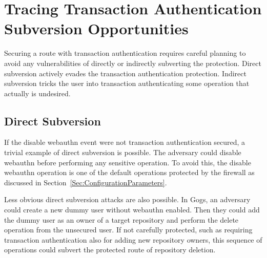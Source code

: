 


\section{Tracing Transaction Authentication \newline Subversion Opportunities}


Securing a route with transaction authentication requires careful planning to avoid any vulnerabilities of directly or indirectly subverting the protection. Direct subversion actively evades the transaction authentication protection. Indirect subversion tricks the user into transaction authenticating some operation that actually is undesired.

\subsection{Direct Subversion}
If the disable webauthn event were not transaction authentication secured, a trivial example of direct subversion is possible. The adversary could disable webauthn before performing any sensitive operation. To avoid this, the disable webauthn operation is one of the default operations protected by the firewall as discussed in Section~\ref{Sec:ConfigurationParameters}.


Less obvious direct subversion attacks are also possible. In Gogs, an adversary could create a new dummy user without webauthn enabled. Then they could add the dummy user as an owner of a target repository and perform the delete operation from the unsecured user. If not carefully protected, such as requiring transaction authentication also for adding new repository owners, this sequence of operations could subvert the protected route of repository deletion.

